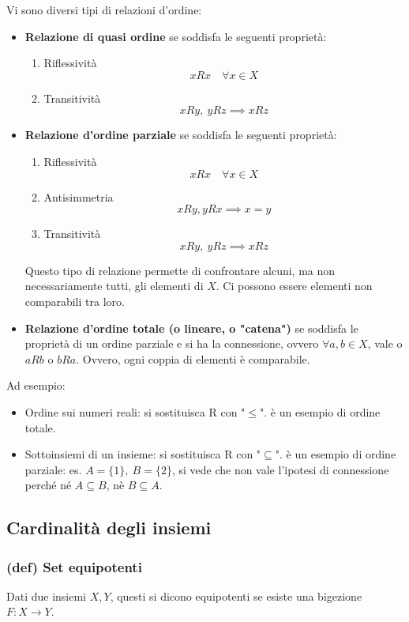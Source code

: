 Vi sono diversi tipi di relazioni d'ordine:
\begin{itemize}
    \item \textbf{Relazione di quasi ordine} se soddisfa le seguenti proprietà:
        \begin{enumerate}[label=\roman*]
            \item Riflessività $$xRx\quad \forall x\in X$$
            \item Transitività $$xRy , \ yRz\implies xRz$$
        \end{enumerate}
    \item \textbf{Relazione d'ordine parziale} se soddisfa le seguenti proprietà:
        \begin{enumerate}[label=\roman*]
            \item Riflessività $$xRx\quad \forall x\in X$$
            \item Antisimmetria $$xRy, yRx \implies x=y$$
            \item Transitività $$xRy , \ yRz\implies xRz$$
        \end{enumerate}
        Questo tipo di relazione permette di confrontare alcuni, ma non necessariamente tutti, gli elementi di $X$. Ci possono essere elementi non comparabili tra loro.
    \item \textbf{Relazione d'ordine totale (o lineare, o "catena")} se soddisfa le proprietà di un ordine parziale e si ha la connessione, ovvero $\forall a,b\in X$, vale o $aRb$ o $bRa$. Ovvero, ogni coppia di elementi è comparabile.
\end{itemize}
Ad esempio:
\begin{itemize}
    \item Ordine sui numeri reali: si sostituisca R con "$\le$". è un esempio di ordine totale.
    \item Sottoinsiemi di un insieme: si sostituisca R con "$\subseteq$". è un esempio di ordine parziale: es. $A=\{1\},\ B=\{2\}$, si vede che non vale l'ipotesi di connessione perché né $A\subseteq B$, nè $B\subseteq A$.
\end{itemize}

\subsection{Cardinalità degli insiemi}
\subsubsection{(def) Set equipotenti}
Dati due insiemi $X,Y$, questi si dicono equipotenti se esiste una bigezione $F:X\to Y$.
